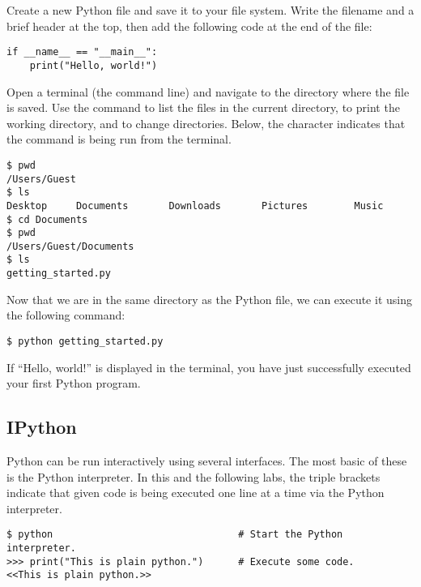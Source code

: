 \begin{problem}
Create a new Python file and save it to your file system.
Write the filename and a brief header at the top, then add the following code at the end of the file:
\begin{lstlisting}
if __name__ == "__main__":
    print("Hello, world!")
\end{lstlisting}

Open a terminal (the command line) and navigate to the directory where the file is saved.
Use the  command to list the files in the current directory,  to print the working directory, and  to change directories.
Below, the \li{\$} character indicates that the command is being run from the terminal.

\begin{lstlisting}
$ pwd
/Users/Guest
$ ls
Desktop     Documents       Downloads       Pictures        Music
$ cd Documents
$ pwd
/Users/Guest/Documents
$ ls
getting_started.py
\end{lstlisting}

Now that we are in the same directory as the Python file, we can execute it using the following command:

\begin{lstlisting}
$ python getting_started.py
\end{lstlisting}

If ``Hello, world!'' is displayed in the terminal, you have just successfully executed your first Python program.
\label{prob:helloWorld}
\end{problem}


\subsection*{IPython}

Python can be run interactively using several interfaces.
The most basic of these is the Python interpreter.
In this and the following labs, the triple brackets \li{>>>} indicate that given code is being executed one line at a time via the Python interpreter.

\begin{lstlisting}
$ python                                # Start the Python interpreter.
>>> print("This is plain python.")      # Execute some code.
<<This is plain python.>>
\end{lstlisting}

